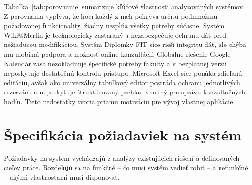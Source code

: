 Tabuľka~\ref{tab:porovnanie} sumarizuje kľúčové vlastnosti analyzovaných systémov. Z porovnania vyplýva, že hoci každý z nich pokrýva určitú podmnožinu požadovanej funkcionality, žiadny nespĺňa všetky potreby súčasne. Systém Wiki@Merlin je technologicky zastaraný a nezabezpečuje ochranu dát pred nežiaducou modifikáciou. Systém Diplomky FIT síce rieši integritu dát, ale chýba mu mobilná podpora a možnosť online konzultácií. Globálne riešenie Google Kalendár zasa nezohľadňuje špecifické potreby fakulty a v bezplatnej verzii neposkytuje dostatočnú kontrolu prístupu. Microsoft Excel síce ponúka
zdieľanú editáciu, avšak ako univerzálny tabuľkový editor
postráda ochranu jednotlivých rezervácií a neposkytuje štruktúrovaný prehľad vhodný
pre správu konzultačných hodín. Tieto nedostatky tvoria priamu motiváciu pre vývoj vlastnej aplikácie.

\section{Špecifikácia požiadaviek na systém}
Požiadavky na systém vychádzajú z analýzy existujúcich riešení a definovaných cieľov práce. Rozdeľujú sa na funkčné – čo musí systém vedieť robiť – a nefunkčné – akými vlastnosťami musí disponovať.
